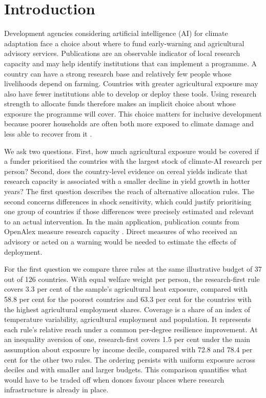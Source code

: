 \section{Introduction}\label{sec:intro}

Development agencies considering artificial intelligence (AI) for climate adaptation face a
choice about where to fund early-warning and agricultural advisory services. Publications are
an observable indicator of local research capacity and may help identify institutions that can
implement a programme. A country can have a strong research base and relatively few people
whose livelihoods depend on farming. Countries with greater agricultural exposure may also
have fewer institutions able to develop or deploy these tools. Using research strength to
allocate funds therefore makes an implicit choice about whose exposure the programme will
cover. This choice matters for inclusive development because poorer households are often both
more exposed to climate damage and less able to recover from it
\citep{hallegatte2017,diffenbaugh2019,christiaensen2011}.

We ask two questions. First, how much agricultural exposure would be covered if a funder
prioritised the countries with the largest stock of climate-AI research per person? Second, does
the country-level evidence on cereal yields indicate that research capacity is associated with
a smaller decline in yield growth in hotter years? The first question describes the reach of
alternative allocation rules. The second concerns differences in shock sensitivity, which could
justify prioritising one group of countries if those differences were precisely estimated and
relevant to an actual intervention. In the main application, publication counts from OpenAlex
measure research capacity \citep{priem2022}. Direct measures of who received an advisory or
acted on a warning would be needed to estimate the effects of deployment.

For the first question we compare three rules at the same illustrative budget of 37 out of
126 countries. With equal welfare weight per person, the research-first rule covers 3.3 per cent
of the sample's agricultural heat exposure, compared with 58.8 per cent for the poorest
countries and 63.3 per cent for the countries with the highest agricultural employment shares.
Coverage is a share of an index of temperature variability, agricultural employment and
population. It represents each rule's relative reach under a common per-degree resilience
improvement. At an inequality aversion of one, research-first covers 1.5 per cent under the main
assumption about exposure by income decile, compared with 72.8 and 78.4 per cent for the other
two rules. The ordering persists with uniform exposure across deciles and with smaller and
larger budgets. This comparison quantifies what would have to be traded off when donors
favour places where research infrastructure is already in place.

